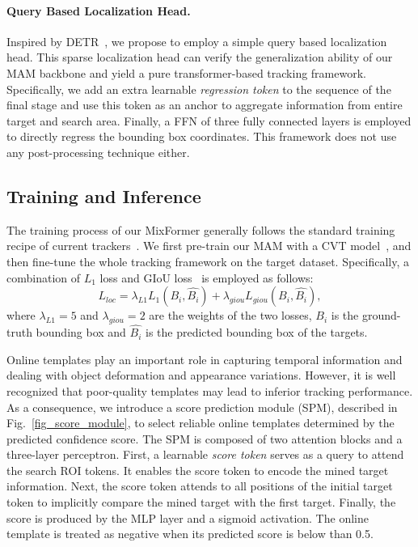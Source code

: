 \paragraph{Query Based Localization Head.}\label{query_head}
Inspired by DETR~\cite{detr}, we propose to employ a simple query based localization head. This sparse localization head can verify the generalization ability of our MAM backbone and yield a pure transformer-based tracking framework. Specifically, we add an extra learnable \emph{regression token} to the sequence of the final stage and use this token as an anchor to aggregate information from entire target and search area. Finally, a FFN of three fully connected layers is employed to directly regress the bounding box coordinates. This framework does not use any post-processing technique either.

\subsection{Training and Inference}
The training process of our MixFormer generally follows the standard training recipe of current trackers~\cite{stark,transt}. We first pre-train our MAM with a CVT model~\cite{cvt}, and then fine-tune the whole tracking framework on the target dataset. 
Specifically, a combination of ${L_1}$ loss and GIoU loss~\cite{giou} is employed as follows:
\begin{equation}
    L_{loc} = \lambda_{L1} L_1(B_i, \hat{B_i}) + \lambda_{giou} L_{giou}(B_i, \hat{B_i}),
\end{equation}
where $\lambda_{L1}=5$ and $\lambda_{giou}=2$ are the weights of the two losses, $B_i$ is the ground-truth bounding box and $\hat{B_i}$ is the predicted bounding box of the targets. 

Online templates play an important role in capturing temporal information and dealing with object deformation and appearance variations. 
However, it is well recognized that poor-quality templates may lead to inferior tracking performance. As a consequence, we introduce a score prediction module (SPM), described in Fig.~\ref{fig_score_module}, to select reliable online templates determined by the predicted confidence score. The SPM is composed of two attention blocks and a three-layer perceptron. First, a learnable \emph{score token} serves as a query to attend the search ROI tokens. It enables the score token to encode the mined target information. Next, the score token attends to all positions of the initial target token to implicitly compare the mined target with the first target. Finally, the score is produced by the MLP layer and a sigmoid activation. The online template is treated as negative when its predicted score is below than 0.5.

